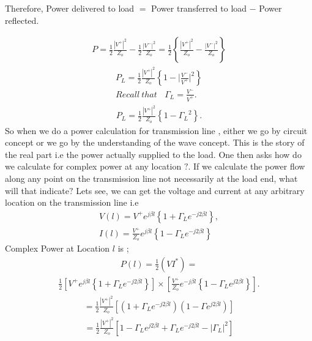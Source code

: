 Therefore, Power delivered to load $=$ Power transferred to load $-$ Power reflected.

\begin{align*} 
P= \frac{1}{2} \frac{ { |V^+ | }^2}{Z_o} -\frac{1}{2} \frac{ {|V^- |}^2 }{Z_o} = \frac{1}{2} \left\lbrace \frac{ { | V^+ | }^2}{Z_o} -\frac{ {|V^- |}^2 }{Z_o} \right\rbrace
\end{align*}
\begin{align*} 
P_L= \frac{1}{2} \frac{ { | V^+ | } ^2}{Z_o} \left\lbrace 1 - { | {\frac{V^-}{V^+}|^2}}\right\rbrace\\
Recall \ that\ \ \ \  \Gamma_L =\frac{V^-}{V^+}.
\end{align*}
\begin{align*}
P_L=\frac{1}{2} \frac{{| V^+ |}^2}{Z_o} \left\lbrace 1 - { \Gamma_L }^2 \right\rbrace.
\end{align*}
So when we do a power calculation for transmission line , either we go by circuit concept or we go by the understanding of the wave concept. This is the story of the real part i.e the power actually supplied to the load. One then asks how do we calculate for complex power at any location $?$. If we calculate the power flow along any point on the transmission line not necessarily at the load end, what will that indicate$?$ Lets see, we can get the voltage and current at any arbitrary location on the transmission line i.e
\begin{align*} 
V(l) = V^+ e^{j\beta l} \left\lbrace 1 + \Gamma_L e^{-j2\beta l} \right\rbrace ,\\ 
I(l) = \frac{V^+}{Z_o} e^{j\beta l} \left\lbrace 1 - \Gamma_L e^{-j2\beta l} \right\rbrace
\end{align*}
Complex Power at Location $l$ is ;
\begin{align*}
P(l) = \frac{1}{2} (V I^*) =
\end{align*}
\begin{align*}
\frac{1}{2} [V^+ e^{j\beta l} \left\lbrace 1 + \Gamma_L e^{-j2\beta l} \right\rbrace ] \times [\frac{V^+}{Z_o} e^{-j\beta l} \left\lbrace 1 - \Gamma_L e^{j2\beta l} \right\rbrace].
\end{align*}
\begin{align*}
=\frac{1}{2} \frac{{| V ^+ |}^2}{Z_o} [( 1 + \Gamma_L e^{-j2\beta l})(1 - \Gamma e^{j2\beta l})]
\end{align*}
\begin{align*}
= \frac{1}{2} \frac{{ | V^+ | }^2}{Z_o} [ 1 - \Gamma_L e^{j2\beta l} + \Gamma_L e^ {-j2\beta l} - {| \Gamma_L | ^2}]
\end{align*}
